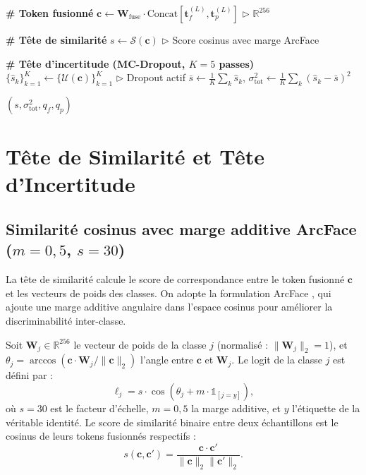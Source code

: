 \documentclass[12pt,a4paper]{report}
\begin{document}
\begin{algorithm}[htbp]
\begin{algorithmic}[1]
\STATE \textbf{\# Token fusionn\'{e}}
\STATE $\mathbf{c} \leftarrow \mathbf{W}_{\text{fuse}} \cdot \text{Concat}[\mathbf{t}_f^{(L)}, \mathbf{t}_p^{(L)}]$ \hfill $\triangleright$ $\mathbb{R}^{256}$

\STATE \textbf{\# T\^{e}te de similarit\'{e}}
\STATE $s \leftarrow \mathcal{S}(\mathbf{c})$ \hfill $\triangleright$ Score cosinus avec marge ArcFace

\STATE \textbf{\# T\^{e}te d'incertitude (MC-Dropout, $K=5$ passes)}
\STATE $\{\hat{s}_k\}_{k=1}^K \leftarrow \{\mathcal{U}(\mathbf{c})\}_{k=1}^K$ \hfill $\triangleright$ Dropout actif
\STATE $\bar{s} \leftarrow \frac{1}{K} \sum_k \hat{s}_k$, $\sigma^2_{\text{tot}} \leftarrow \frac{1}{K} \sum_k (\hat{s}_k - \bar{s})^2$

\RETURN $(s, \sigma^2_{\text{tot}}, q_f, q_p)$
\end{algorithmic}
\end{algorithm}

\section{T\^{e}te de Similarit\'{e} et T\^{e}te d'Incertitude}
\label{sec:similarite}

\subsection{Similarit\'{e} cosinus avec marge additive ArcFace ($m=0{,}5$, $s=30$)}

La t\^{e}te de similarit\'{e} calcule le score de correspondance entre le token fusionn\'{e} $\mathbf{c}$ et les vecteurs de poids des classes. On adopte la formulation ArcFace \cite{deng2019arcface}, qui ajoute une marge additive angulaire dans l'espace cosinus pour am\'{e}liorer la discriminabilit\'{e} inter-classe.

Soit $\mathbf{W}_j \in \mathbb{R}^{256}$ le vecteur de poids de la classe $j$ (normalis\'{e} : $\|\mathbf{W}_j\|_2 = 1$), et $\theta_j = \arccos(\mathbf{c} \cdot \mathbf{W}_j / \|\mathbf{c}\|_2)$ l'angle entre $\mathbf{c}$ et $\mathbf{W}_j$. Le logit de la classe $j$ est d\'{e}fini par :
\begin{equation}
\label{eq:arcface}
\ell_j = s \cdot \cos(\theta_j + m \cdot \mathbb{1}_{[j = y]}),
\end{equation}
o\`{u} $s = 30$ est le facteur d'\'{e}chelle, $m = 0{,}5$ la marge additive, et $y$ l'\'{e}tiquette de la v\'{e}ritable identit\'{e}. Le score de similarit\'{e} binaire entre deux \'{e}chantillons est le cosinus de leurs tokens fusionn\'{e}s respectifs :
\begin{equation}
s(\mathbf{c}, \mathbf{c}') = \frac{\mathbf{c} \cdot \mathbf{c}'}{\|\mathbf{c}\|_2 \|\mathbf{c}'\|_2}.
\end{equation}
\end{document}
